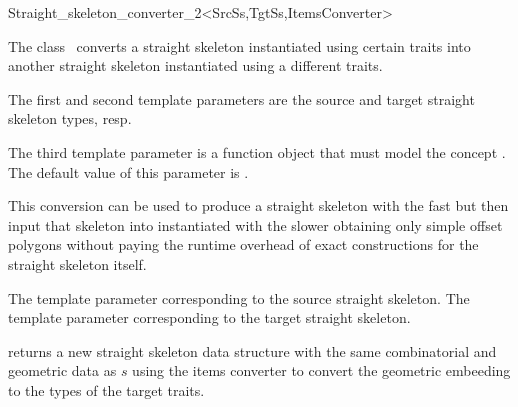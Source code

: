 

\begin{ccRefClass}{Straight_skeleton_converter_2<SrcSs,TgtSs,ItemsConverter>}


\ccDefinition

The class \ccRefName\ converts a straight skeleton instantiated using certain traits into another straight skeleton instantiated using a different traits.

The first and second template parameters are the source and target straight skeleton types, resp.

The third template parameter  is a function object that must
model the concept . The default value of this parameter is .

This conversion can be used to produce a straight skeleton with the fast
 but then input that skeleton
into  instantiated with the slower  obtaining only simple offset
polygons without paying the runtime overhead of exact constructions for the straight 
skeleton itself.

\ccTypes
{}
  {The  template parameter corresponding to the source straight skeleton.}
\ccGlue
{}
  {The  template parameter corresponding to the target straight skeleton.}


\ccOperations

\ccTagFullDeclarations
{}
{ returns a new straight skeleton data structure with the same combinatorial and geometric data as $s$ using the items converter to convert the geometric embeeding to the types of the target traits.}

\ccSeeAlso
{}\\
\\

\end{ccRefClass}


